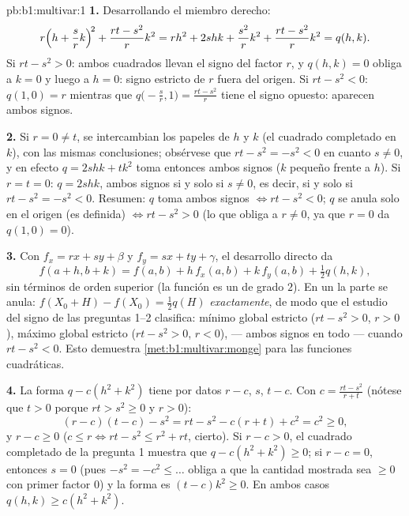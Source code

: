 \begin{solution}{pb:b1:multivar:1}
\textbf{1.} Desarrollando el miembro derecho:
\[
r\Bigl(h + \frac srk\Bigr)^{\!2} + \frac{rt - s^2}{r}k^2
= rh^2 + 2shk + \frac{s^2}{r}k^2 + \frac{rt - s^2}{r}k^2
= q(h,k) .
\]
Si $rt - s^2 > 0$: ambos cuadrados llevan el signo del factor $r$,
y $q(h,k) = 0$ obliga a $k = 0$ y luego a $h = 0$: signo estricto de $r$
fuera del origen. Si $rt - s^2 < 0$: $q(1, 0) = r$ mientras que
$q\bigl(-\frac sr, 1\bigr) = \frac{rt - s^2}{r}$ tiene el
signo opuesto: aparecen ambos signos.

\textbf{2.} Si $r = 0 \neq t$, se intercambian los papeles de $h$ y $k$
(el cuadrado completado en $k$), con las mismas conclusiones; obsérvese que
$rt - s^2 = -s^2 < 0$ en cuanto $s \neq 0$, y en efecto $q =
2shk + tk^2$ toma entonces ambos signos ($k$ pequeño frente a $h$). Si
$r = t = 0$: $q = 2shk$, ambos signos si y solo si $s \neq 0$, es decir, si y solo si
$rt - s^2 = -s^2 < 0$. Resumen: $q$ toma ambos signos $\iff rt -
s^2 < 0$; $q$ se anula solo en el origen (es definida) $\iff rt -
s^2 > 0$ (lo que obliga a $r \neq 0$, ya que $r = 0$ da $q(1,0) =
0$).

\textbf{3.} Con $f_x = rx + sy + \beta$ y $f_y = sx + ty +
\gamma$, el desarrollo directo da
\[
f(a + h, b + k) = f(a, b) + h\,f_x(a,b) + k\,f_y(a,b)
+ \tfrac12 q(h, k),
\]
sin términos de orden superior (la función es un  de grado
$2$). En un  la parte  se anula: $f(X_0 + H)
- f(X_0) = \frac12 q(H)$ \emph{exactamente}, de modo que el estudio del signo de
las preguntas 1--2 clasifica: mínimo global estricto ($rt - s^2 >
0$, $r > 0$), máximo global estricto ($rt - s^2 > 0$, $r < 0$),
 --- ambos signos en todo  --- cuando $rt - s^2 <
0$. Esto demuestra \cref{met:b1:multivar:monge} para las funciones
cuadráticas.

\textbf{4.} La forma $q - c(h^2 + k^2)$ tiene por datos $r - c$, $s$,
$t - c$. Con $c = \frac{rt - s^2}{r + t}$ (nótese que $t > 0$ porque
$rt > s^2 \geq 0$ y $r > 0$):
\[
(r - c)(t - c) - s^2 = rt - s^2 - c(r + t) + c^2 = c^2 \geq 0,
\]
y $r - c \geq 0$ ($c \leq r \iff rt - s^2 \leq r^2 + rt$,
cierto). Si $r - c > 0$, el cuadrado completado de la pregunta 1 muestra que
$q - c(h^2 + k^2) \geq 0$; si $r - c = 0$, entonces $s = 0$ (pues
$-s^2 = -c^2 \leq \dots$ obliga a que la cantidad mostrada sea
$\geq 0$ con primer factor $0$) y la forma es $(t - c)k^2 \geq
0$. En ambos casos $q(h,k) \geq c(h^2 + k^2)$.


\end{solution}
